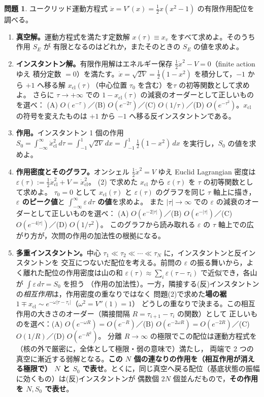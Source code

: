 \documentclass[dvipdfmx, uplatex]{jsarticle}
\theoremstyle{definition}
\newtheorem{prob}{問題}
\begin{document}
\begin{prob}\label{prob:classical}
ユークリッド運動方程式 $\ddot x=V'(x)=\tfrac12 x(x^2-1)$ の有限作用配位を調べる。
\begin{enumerate}
\item \textbf{真空解。}運動方程式を満たす定数解 $x(\tau)\equiv x_v$ をすべて求めよ。そのうち作用 $S_E$ が
有限となるのはどれか，またそのときの $S_E$ の値を求めよ。
\item \textbf{インスタントン解。}有限作用解はエネルギー保存 $\tfrac12\dot x^2-V=0$（finite action ゆえ
積分定数 $=0$）を満たす。$\dot x=\sqrt{2V}=\tfrac12(1-x^2)$ を積分して，$-1$ から $+1$ へ移る解
$x_{\mathrm{cl}}(\tau)$（中心位置 $\tau_0$ を含む）を$\tau$ の初等関数として求めよ。
さらに $\tau\to+\infty$ での $1-x_{\mathrm{cl}}(\tau)$ の減衰のオーダーとして正しいものを選べ：
(A) $O(e^{-\tau})$／(B) $O(e^{-2\tau})$／(C) $O(1/\tau)$／(D) $O(e^{-\tau^2})$。$x_{\mathrm{cl}}$ の符号を変えたものは
$+1$ から $-1$ へ移る反インスタントンである。
\item \textbf{作用。}インスタントン 1 個の作用
$S_0=\int_{-\infty}^{\infty}\dot x_{\mathrm{cl}}^2\,d\tau=\int_{-1}^{1}\sqrt{2V}\,dx
=\int_{-1}^{1}\tfrac12(1-x^2)\,dx$
を実行し，$S_0$ の値を求めよ。
\item \textbf{作用密度とそのグラフ。}オンシェル $\tfrac12\dot x^2=V$ ゆえ Euclid Lagrangian 密度は
$\varepsilon(\tau):=\tfrac12\dot x_{\mathrm{cl}}^2+V=\dot x_{\mathrm{cl}}^2$。
(2) で求めた $x_{\mathrm{cl}}$ から $\varepsilon(\tau)$ を $\tau$ の初等関数として求めよ。
$\tau_0=0$ として $x_{\mathrm{cl}}(\tau)$ と $\varepsilon(\tau)$ のグラフを同じ $\tau$ 軸上に描き，
\textbf{$\varepsilon$ のピーク値}と \textbf{$\displaystyle\int_{-\infty}^\infty\varepsilon\,d\tau$ の値}を求めよ。
また $|\tau|\to\infty$ での $\varepsilon$ の減衰のオーダーとして正しいものを選べ：
(A) $O(e^{-2|\tau|})$／(B) $O(e^{-|\tau|})$／(C) $O(e^{-4|\tau|})$／(D) $O(1/\tau^2)$。
このグラフから読み取れる $\varepsilon$ の $\tau$ 軸上での広がり方が，次問の作用の加法性の根拠になる。
\item \textbf{多重インスタントン。}中心 $\tau_1\ll\tau_2\ll\cdots\ll\tau_N$ に，インスタントンと反インスタントンを
交互につないだ配位を考える。前問の $\varepsilon$ の振る舞いから，よく離れた配位の作用密度は山の和
$\varepsilon(\tau)\approx\sum_i\varepsilon(\tau-\tau_i)$ で近似でき，各山が $\int\varepsilon\,d\tau=S_0$ を担う
（作用の加法性）。一方，隣接する(反)インスタントンの\emph{相互作用}は，作用密度の重なりではなく
問題(2)で求めた\textbf{場の裾} $1\mp x_{\mathrm{cl}}\sim e^{-\omega|\tau-\tau_i|}$（$\omega^2=V''(1)=1$）
どうしの重なりで決まる。この相互作用の大きさのオーダー（隣接間隔 $R=\tau_{i+1}-\tau_i$ の関数）として
正しいものを選べ：(A) $O(e^{-\omega R})=O(e^{-R})$／(B) $O(e^{-2\omega R})=O(e^{-2R})$／(C) $O(1/R)$／(D) $O(e^{-R^2})$。
分離 $R\to\infty$ の極限でこの配位は運動方程式を（核の外で厳密に，全体として極限・弱の意味で）満たし，
両端で 2 つの真空に漸近する弱解となる。\textbf{この $N$ 個の連なりの作用を（相互作用が消える極限で）
$N$ と $S_0$ で表せ}。とくに，同じ真空へ戻る配位（基底状態の振幅に効くもの）は(反)インスタントンが
偶数個 $2N$ 個並んだもので，\textbf{その作用を $N,S_0$ で表せ}。
\end{enumerate}
\end{prob}
\end{document}
